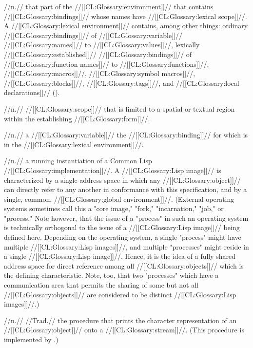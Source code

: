  //n.// that part of the //[[CL:Glossary:environment]]// that contains //[[CL:Glossary:bindings]]// whose names have //[[CL:Glossary:lexical scope]]//. A //[[CL:Glossary:lexical environment]]// contains, among other things: ordinary //[[CL:Glossary:bindings]]// of //[[CL:Glossary:variable]]// //[[CL:Glossary:names]]// to //[[CL:Glossary:values]]//, lexically //[[CL:Glossary:established]]// //[[CL:Glossary:bindings]]// of //[[CL:Glossary:function names]]// to //[[CL:Glossary:functions]]//, //[[CL:Glossary:macros]]//, //[[CL:Glossary:symbol macros]]//, //[[CL:Glossary:blocks]]//, //[[CL:Glossary:tags]]//, and //[[CL:Glossary:local declarations]]// ().

 //n.// //[[CL:Glossary:scope]]// that is limited to a spatial or textual region within the establishing //[[CL:Glossary:form]]//. 

 //n.// a //[[CL:Glossary:variable]]// the //[[CL:Glossary:binding]]// for which is in the //[[CL:Glossary:lexical environment]]//.


 //n.// a running instantiation of a Common Lisp //[[CL:Glossary:implementation]]//. A //[[CL:Glossary:Lisp image]]// is characterized by a single address space in which any //[[CL:Glossary:object]]// can directly refer to any another in conformance with this specification, and by a single, common, //[[CL:Glossary:global environment]]//. (External operating systems sometimes call this a "core image," "fork," "incarnation," "job," or "process." Note however, that the issue of a "process" in such an operating system is technically orthogonal to the issue of a //[[CL:Glossary:Lisp image]]// being defined here. Depending on the operating system, a single "process" might have multiple //[[CL:Glossary:Lisp images]]//, and multiple "processes" might reside in a single //[[CL:Glossary:Lisp image]]//. Hence, it is the idea of a fully shared address space for direct reference among all //[[CL:Glossary:objects]]// which is the defining characteristic. Note, too, that two "processes" which have a communication area that permits the sharing of some but not all //[[CL:Glossary:objects]]// are considered to be distinct //[[CL:Glossary:Lisp images]]//.)

 //n.// //Trad.// the procedure that prints the character representation of an //[[CL:Glossary:object]]// onto a //[[CL:Glossary:stream]]//. (This procedure is implemented by .)
 
